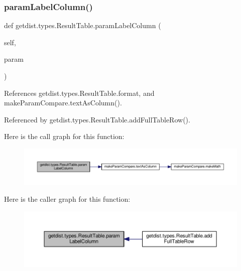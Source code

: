 \subsubsection{\texorpdfstring{param\+Label\+Column()}{paramLabelColumn()}}
{\footnotesize\ttfamily def getdist.\+types.\+Result\+Table.\+param\+Label\+Column (\begin{DoxyParamCaption}\item[{}]{self,  }\item[{}]{param }\end{DoxyParamCaption})}



References getdist.\+types.\+Result\+Table.\+format, and make\+Param\+Compare.\+text\+As\+Column().



Referenced by getdist.\+types.\+Result\+Table.\+add\+Full\+Table\+Row().

Here is the call graph for this function\+:
\nopagebreak
\begin{figure}[H]
\begin{center}
\leavevmode
\includegraphics[width=350pt]{classgetdist_1_1types_1_1ResultTable_ae48ef77cd332e1199779bd19aca6d8a3_cgraph}
\end{center}
\end{figure}
Here is the caller graph for this function\+:
\nopagebreak
\begin{figure}[H]
\begin{center}
\leavevmode
\includegraphics[width=350pt]{classgetdist_1_1types_1_1ResultTable_ae48ef77cd332e1199779bd19aca6d8a3_icgraph}
\end{center}
\end{figure}
\mbox{\label{classgetdist_1_1types_1_1ResultTable_addfef62f3aa37ec0b38785d6cd890595}} 
